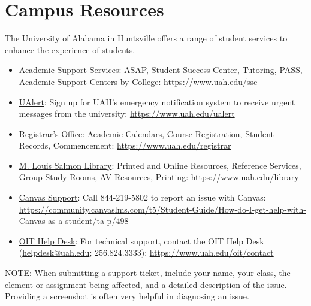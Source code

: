 \documentclass[11pt,oneside,openany]{book}
\begin{document}
\chapter{Campus Resources}
\label{ch:campus Resources}
The University of Alabama in Huntsville offers a range of student services to enhance the experience of students.
\begin{itemize}
    \item \href{https://www.uah.edu/ssc}{Academic Support Services}: ASAP, Student Success Center, Tutoring, PASS, Academic Support Centers by College: \url{https://www.uah.edu/ssc}
    \item \href{https://www.uah.edu/ualert}{UAlert}: Sign up for UAH's emergency notification system to receive urgent messages from the university: \url{https://www.uah.edu/ualert}
    \item \href{https://www.uah.edu/registrar}{Registrar's Office}: Academic Calendars, Course Registration, Student Records, Commencement: \url{https://www.uah.edu/registrar}
    \item \href{https://www.uah.edu/library}{M. Louis Salmon Library}: Printed and Online Resources, Reference Services, Group Study Rooms, AV Resources, Printing: \url{https://www.uah.edu/library}
    \item \href{https://community.canvaslms.com/t5/Student-Guide/How-do-I-get-help-with-Canvas-as-a-student/ta-p/498}{Canvas Support}: Call 844-219-5802 to report an issue with Canvas: \url{https://community.canvaslms.com/t5/Student-Guide/How-do-I-get-help-with-Canvas-as-a-student/ta-p/498}
    \item \href{https://www.uah.edu/oit/contact}{OIT Help Desk}: For technical support, contact the OIT Help Desk (\href{mailto:helpdesk@uah.edu}{helpdesk@uah.edu}; 256.824.3333): \url{https://www.uah.edu/oit/contact}
\end{itemize}

\vspace{6pt}
NOTE: When submitting a support ticket, include your name, your class, the element or assignment being affected, and a detailed description of the issue. Providing a screenshot is often very helpful in diagnosing an issue.
\end{document}
